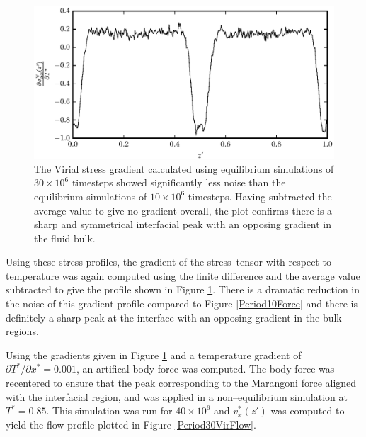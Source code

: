 \begin{figure}[h]
\centering
\includegraphics[scale=0.8]{Period30VirForce}
\caption{The Virial stress gradient calculated using equilibrium simulations of $30 \times 10^{6}$ timesteps showed significantly less noise than the equilibrium simulations of $10 \times 10^{6}$ timesteps.
Having subtracted the average value to give no gradient overall, the plot confirms there is a sharp and symmetrical interfacial peak with an opposing gradient in the fluid bulk.
}
\label{Period30VirForce}
\end{figure}
Using these stress profiles, the gradient of the stress--tensor with respect to temperature was again computed using the finite difference and the average value subtracted to give the profile shown in Figure \ref{Period30VirForce}.
There is a dramatic reduction in the noise of this gradient profile compared to Figure \ref{Period10Force} and there is definitely a sharp peak at the interface with an opposing gradient in the bulk regions.
\FloatBarrier

Using the gradients given in Figure \ref{Period30VirForce} and a temperature gradient of $\partial T^{*} / \partial x^{*} = 0.001$, an artifical body force was computed.
The body force was recentered to ensure that the peak corresponding to the Marangoni force aligned with the interfacial region, and was applied in a non--equilibrium simulation at $T^{*} = 0.85$.
This simulation was run for $40 \times 10^{6}$ and $v^{*}_x(z')$ was computed to yield the flow profile plotted in Figure \ref{Period30VirFlow}.

